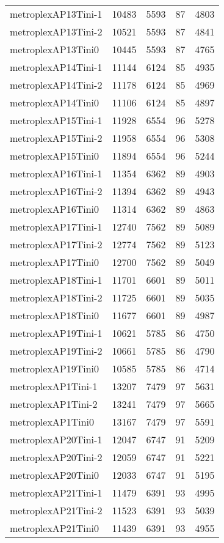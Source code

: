 \begin{longtable}{lrrrr}
metroplexAP13Tini-1 & 10483 & 5593 & 87 & 4803 \\
metroplexAP13Tini-2 & 10521 & 5593 & 87 & 4841 \\
metroplexAP13Tini0 & 10445 & 5593 & 87 & 4765 \\
metroplexAP14Tini-1 & 11144 & 6124 & 85 & 4935 \\
metroplexAP14Tini-2 & 11178 & 6124 & 85 & 4969 \\
metroplexAP14Tini0 & 11106 & 6124 & 85 & 4897 \\
metroplexAP15Tini-1 & 11928 & 6554 & 96 & 5278 \\
metroplexAP15Tini-2 & 11958 & 6554 & 96 & 5308 \\
metroplexAP15Tini0 & 11894 & 6554 & 96 & 5244 \\
metroplexAP16Tini-1 & 11354 & 6362 & 89 & 4903 \\
metroplexAP16Tini-2 & 11394 & 6362 & 89 & 4943 \\
metroplexAP16Tini0 & 11314 & 6362 & 89 & 4863 \\
metroplexAP17Tini-1 & 12740 & 7562 & 89 & 5089 \\
metroplexAP17Tini-2 & 12774 & 7562 & 89 & 5123 \\
metroplexAP17Tini0 & 12700 & 7562 & 89 & 5049 \\
metroplexAP18Tini-1 & 11701 & 6601 & 89 & 5011 \\
metroplexAP18Tini-2 & 11725 & 6601 & 89 & 5035 \\
metroplexAP18Tini0 & 11677 & 6601 & 89 & 4987 \\
metroplexAP19Tini-1 & 10621 & 5785 & 86 & 4750 \\
metroplexAP19Tini-2 & 10661 & 5785 & 86 & 4790 \\
metroplexAP19Tini0 & 10585 & 5785 & 86 & 4714 \\
metroplexAP1Tini-1 & 13207 & 7479 & 97 & 5631 \\
metroplexAP1Tini-2 & 13241 & 7479 & 97 & 5665 \\
metroplexAP1Tini0 & 13167 & 7479 & 97 & 5591 \\
metroplexAP20Tini-1 & 12047 & 6747 & 91 & 5209 \\
metroplexAP20Tini-2 & 12059 & 6747 & 91 & 5221 \\
metroplexAP20Tini0 & 12033 & 6747 & 91 & 5195 \\
metroplexAP21Tini-1 & 11479 & 6391 & 93 & 4995 \\
metroplexAP21Tini-2 & 11523 & 6391 & 93 & 5039 \\
metroplexAP21Tini0 & 11439 & 6391 & 93 & 4955 \\

\end{longtable}
